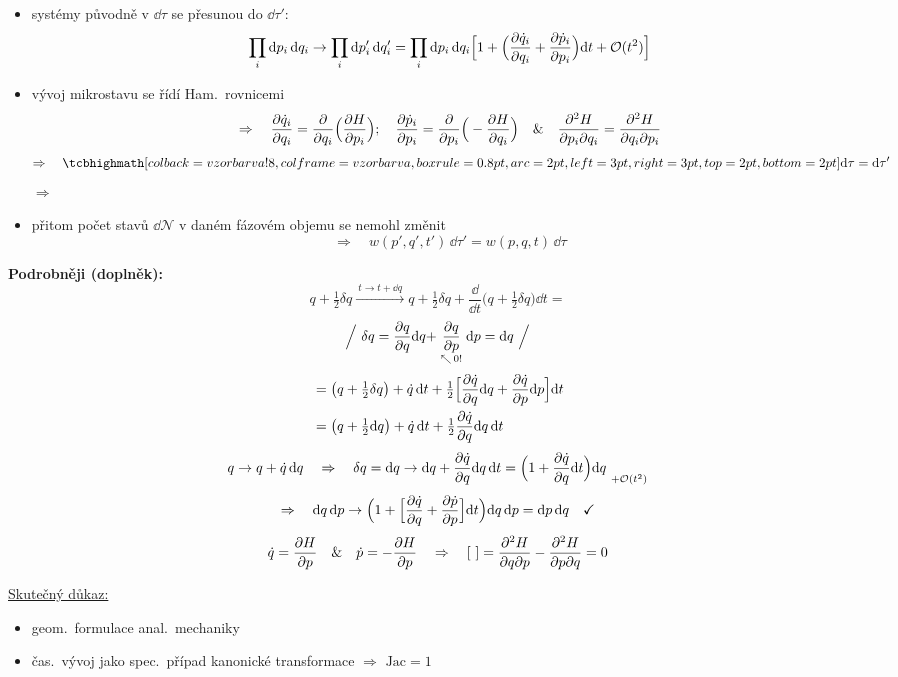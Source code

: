 \begin{itemize}
  \item systémy původně v $\dd\tau$ se přesunou do $\dd\tau'$:
  \[
    \prod_i\dd p_i\,\dd q_i \to \prod_i\dd p_i'\,\dd q_i' = \prod_i\dd p_i\,\dd q_i\Big[1 + \Big(\pdv{\dot q_i}{q_i} + \pdv{\dot p_i}{p_i}\Big)\dd t + \mathcal O(t^2)\Big]
  \]
  \item vývoj mikrostavu se řídí Ham.\ rovnicemi
  \[
    \Rightarrow\quad \pdv{\dot q_i}{q_i} = \pdv{q_i}\Big(\pdv{H}{p_i}\Big);\quad
    \pdv{\dot p_i}{p_i} = \pdv{p_i}\Big(-\pdv{H}{q_i}\Big)
    \quad\&\quad \frac{\partial^2H}{\partial p_i\partial q_i} = \frac{\partial^2H}{\partial q_i\partial p_i}
  \]
  \[
    \Rightarrow\quad \vzorec{\dd\tau = \dd\tau'}
  \]
  $\Rightarrow$ 
  \item přitom počet stavů $\dd\mathcal N$ v daném fázovém objemu se nemohl změnit
  \[ \Rightarrow\quad w(p',q',t')\,\dd\tau' = w(p,q,t)\,\dd\tau \]
\end{itemize}

{\color{NavyBlue}
\textbf{Podrobněji (doplněk):}
\[
  q + \tfrac12\delta q \xrightarrow{\ t\to t+\dd q\ } q + \tfrac12\delta q + \frac{\dd}{\dd t}\big(q + \tfrac12\delta q\big)\dd t =
\]
\[
  \Big/\ \delta q = \pdv{q}{q}\dd q + \underset{\nwarrow\,0!}{\pdv{q}{p}}\dd p = \dd q\ \Big/
\]
\begin{align*}
  &= \big(q + \tfrac12\delta q\big) + \dot q\,\dd t + \tfrac12\Big[\pdv{\dot q}{q}\dd q + \pdv{\dot q}{p}\dd p\Big]\dd t \\
  &= \big(q + \tfrac12\dd q\big) + \dot q\,\dd t + \tfrac12\pdv{\dot q}{q}\dd q\,\dd t
\end{align*}
\[
  q \to q + \dot q\,\dd q \quad\Rightarrow\quad \delta q = \dd q \to \dd q + \pdv{\dot q}{q}\dd q\,\dd t = \Big(1 + \pdv{\dot q}{q}\dd t\Big)\dd q \ \underset{+\mathcal O(t^2)}{}
\]
\[
  \Rightarrow\quad \dd q\,\dd p \to \Big(1 + \Big[\pdv{\dot q}{q} + \pdv{\dot p}{p}\Big]\dd t\Big)\dd q\,\dd p = \dd p\,\dd q \quad\checkmark
\]
\[
  \dot q = \pdv{H}{p} \quad\&\quad \dot p = -\pdv{H}{p} \quad\Rightarrow\quad
  [\ ] = \frac{\partial^2H}{\partial q\partial p} - \frac{\partial^2H}{\partial p\partial q} = 0
\]
}

\medskip
{\color{OliveGreen}
\underline{Skutečný důkaz:}
\begin{itemize}
  \item[$\to$] geom.\ formulace anal.\ mechaniky
  \item[$\to$] čas.\ vývoj jako spec.\ případ kanonické transformace $\Rightarrow$ $\mathrm{Jac} = 1$ 
\end{itemize}
}

